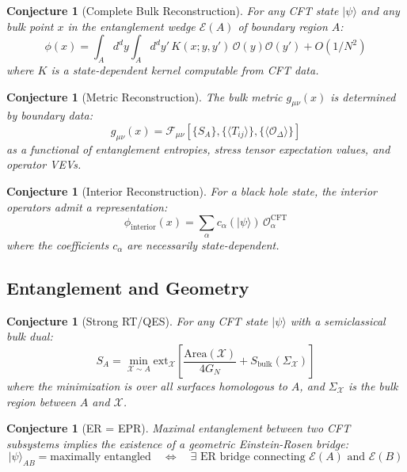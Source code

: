 \documentclass[12pt,a4paper]{article}
\newtheorem{conjecture}[theorem]{Conjecture}
\begin{document}
\begin{conjecture}[Complete Bulk Reconstruction]
For any CFT state $|\psi\rangle$ and any bulk point $x$ in the entanglement wedge $\mathcal{E}(A)$ of boundary region $A$:
\begin{equation}
\phi(x) = \int_A d^dy \int_A d^dy' \, K(x; y, y') \, \mathcal{O}(y) \mathcal{O}(y') + O(1/N^2)
\end{equation}
where $K$ is a state-dependent kernel computable from CFT data.
\end{conjecture}

\begin{conjecture}[Metric Reconstruction]
The bulk metric $g_{\mu\nu}(x)$ is determined by boundary data:
\begin{equation}
g_{\mu\nu}(x) = \mathcal{F}_{\mu\nu}\left[\{S_A\}, \{\langle T_{ij}\rangle\}, \{\langle \mathcal{O}_\Delta \rangle\}\right]
\end{equation}
as a functional of entanglement entropies, stress tensor expectation values, and operator VEVs.
\end{conjecture}

\begin{conjecture}[Interior Reconstruction]
For a black hole state, the interior operators admit a representation:
\begin{equation}
\phi_{\text{interior}}(x) = \sum_{\alpha} c_\alpha(|\psi\rangle) \, \mathcal{O}_\alpha^{\text{CFT}}
\end{equation}
where the coefficients $c_\alpha$ are necessarily state-dependent.
\end{conjecture}

\subsection{Entanglement and Geometry}

\begin{conjecture}[Strong RT/QES]
For any CFT state $|\psi\rangle$ with a semiclassical bulk dual:
\begin{equation}
S_A = \min_{\mathcal{X} \sim A} \text{ext}_{\mathcal{X}} \left[ \frac{\text{Area}(\mathcal{X})}{4G_N} + S_{\text{bulk}}(\Sigma_\mathcal{X}) \right]
\end{equation}
where the minimization is over all surfaces homologous to $A$, and $\Sigma_\mathcal{X}$ is the bulk region between $A$ and $\mathcal{X}$.
\end{conjecture}

\begin{conjecture}[ER = EPR]
Maximal entanglement between two CFT subsystems implies the existence of a geometric Einstein-Rosen bridge:
\begin{equation}
|\psi\rangle_{AB} = \text{maximally entangled} \quad \Leftrightarrow \quad \exists \text{ ER bridge connecting } \mathcal{E}(A) \text{ and } \mathcal{E}(B)
\end{equation}
\end{conjecture}
\end{document}
